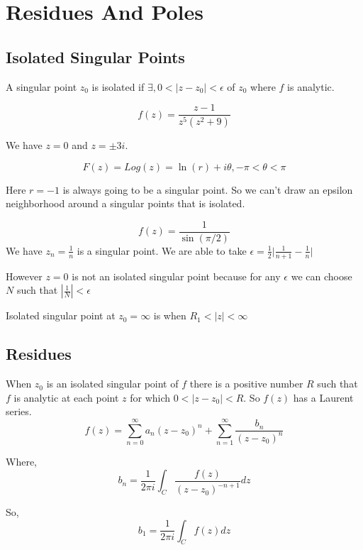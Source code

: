 \chapter{Residues And Poles}
\section{Isolated Singular Points}

A singular point $z_0$ is isolated if $\exists ,0 < | z- z_0| < \epsilon$  of $z_0$ where $f$ is analytic.

\begin{eg}
   
   $$ f(z) = \frac{z - 1}{z^{5}(z^{2}+9)} $$ 


   We have $z = 0$ and $z = \pm 3i$. 
\end{eg}
\begin{eg}
   $$F(z) = Log(z) = \ln(r) + i \theta, -\pi < \theta < \pi$$

   Here $r = -1$ is always going to be a singular point. So we can't draw an epsilon neighborhood around a singular points that is isolated.
\end{eg}

\begin{eg}
   $$ f(z) = \frac{1}{\sin(\pi /2)} $$ 
   We have $z_n = \frac{1}{n}$ is a singular point. We are able to take $\epsilon = \frac{1}{2}\big|\frac{1}{n+1} - \frac{1}{n} \big |$

However $z = 0$ is not an isolated singular point because for any $\epsilon$ we can choose $N$ such that $|\frac{1}{N}| < \epsilon$
\end{eg}

\begin{eg}
   Isolated singular point at $z_0 = \infty$ is when $R_1 < |z| < \infty$
\end{eg}

\section{Residues}
When $z_0$ is an isolated singular point of $f$ there is a positive number $R$ such that $f$ is analytic at each point $z$ for which $0 < |z - z_0| < R$. So $f(z)$ has a Laurent series. 
$$ f(z) = \sum_{n=0}^{\infty} a_n (z - z_0)^{n} + \sum_{n=1}^{\infty} \frac{b_n}{(z - z_0)^{n}} $$ 

Where, 
$$ b_n = \frac{1}{2\pi i}\int_C \frac{f(z)}{(z - z_0)^{-n + 1}} dz $$ 

So, 
$$ b_1 = \frac{1}{2 \pi i} \int_C f(z) dz $$ 


